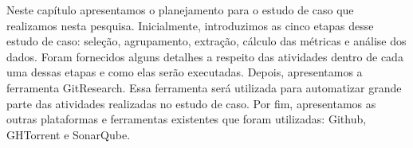 Neste capítulo apresentamos o planejamento para o estudo de caso que realizamos nesta pesquisa. Inicialmente, introduzimos as cinco etapas desse estudo de caso: seleção, agrupamento, extração, cálculo das métricas e análise dos dados. Foram fornecidos alguns detalhes a respeito das atividades dentro de cada uma dessas etapas e como elas serão executadas. Depois, apresentamos a ferramenta GitResearch. Essa ferramenta será utilizada para automatizar grande parte das atividades realizadas no estudo de caso. Por fim, apresentamos as outras plataformas e ferramentas existentes que foram utilizadas: Github, GHTorrent e SonarQube. 










